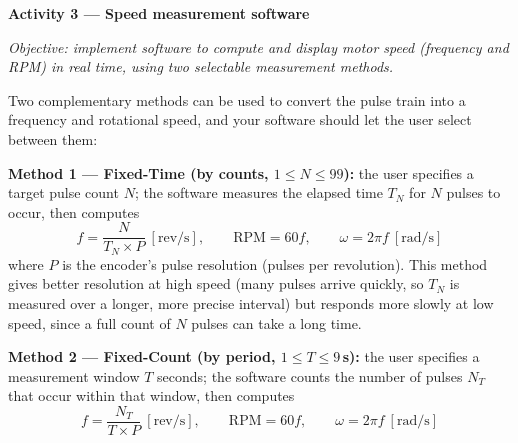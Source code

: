 \begin{procedure}
  \begin{boxedfigure}
    \centering
    \label{fig:exp7-signalpath}
  \end{boxedfigure}
  \newpage

  \textbf{Activity 3 --- Speed measurement software}\vspace{2pt}

  \textit{Objective: implement software to compute and display motor speed (frequency and RPM) in real time, using two selectable measurement methods.}

  Two complementary methods can be used to convert the pulse train into a frequency and rotational speed, and your software should let the user select between them:
  \vspace*{1.5em}

  \textbf{Method 1 --- Fixed-Time (by counts, $1\leq N \leq 99$):} the user specifies a target pulse count $N$; the software measures the elapsed time $T_N$ for $N$ pulses to occur, then computes
  \[
    f = \frac{N}{T_N \times P} \ \left[\text{rev/s}\right], \qquad
    \text{RPM} = 60f, \qquad
    \omega = 2\pi f \ \left[\text{rad/s}\right]
  \]
  where $P$ is the encoder's pulse resolution (pulses per revolution). This method gives better resolution at high speed (many pulses arrive quickly, so $T_N$ is measured over a longer, more precise interval) but responds more slowly at low speed, since a full count of $N$ pulses can take a long time.
  \vspace*{1.5em}

  \textbf{Method 2 --- Fixed-Count (by period, $1\leq T \leq 9$\,s):} the user specifies a measurement window $T$ seconds; the software counts the number of pulses $N_T$ that occur within that window, then computes
  \[
    f = \frac{N_T}{T \times P} \ \left[\text{rev/s}\right], \qquad
    \text{RPM} = 60f, \qquad
    \omega = 2\pi f \ \left[\text{rad/s}\right]
  \]


\end{procedure}
